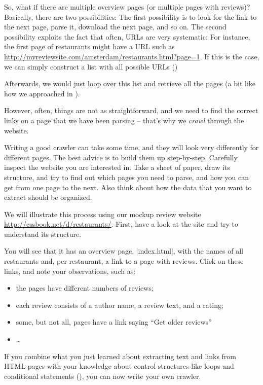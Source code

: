 So, what if there are multiple overview pages (or multiple pages with
reviews)? Basically, there are two possibilities: The first
possibility is to look for the link to the next page, parse it,
download the next page, and so on.  The second possibility exploits
the fact that often, URLs are very systematic: For instance, the first
page of restaurants might have a URL such as
\url{http://myreviewsite.com/amsterdam/restaurants.html?page=1}.  If this
is the case, we can simply construct a list with all possible URLs
()


Afterwards, we would just loop over this list and retrieve all the
pages (a bit like how we approached  in ).

However, often, things are not as straightforward, and we need to find
the correct links on a page that we have been parsing -- that's why we
\emph{crawl} through the website.

Writing a good crawler can take some time, and they will look very
differently for different pages. The best advice is to build them up
step-by-step. Carefully inspect the website you are interested in.
Take a sheet of paper, draw its structure, and try to find out which
pages you need to parse, and how you can get from one page to the next.
Also think about how the data that you want to extract should be organized.

We will illustrate this process using our mockup review website \url{http://cssbook.net/d/restaurants/}.
First, have a look at the site and try to understand its structure.

You will see that it has an overview page, |index.html|, with the
names of all restaurants and, per restaurant, a link to a page with reviews.
Click on these links, and note your observations, such as:
\begin{itemize}
\item the pages have different numbers of reviews;
\item each review consists of a author name, a review text, and a rating;
\item some, but not all, pages have a link saying ``Get older reviews''
\item \ldots
\end{itemize}

If you combine what you just learned about extracting text and links from HTML
pages with your knowledge about control structures like loops and conditional
statements (), you can now write your own crawler.

